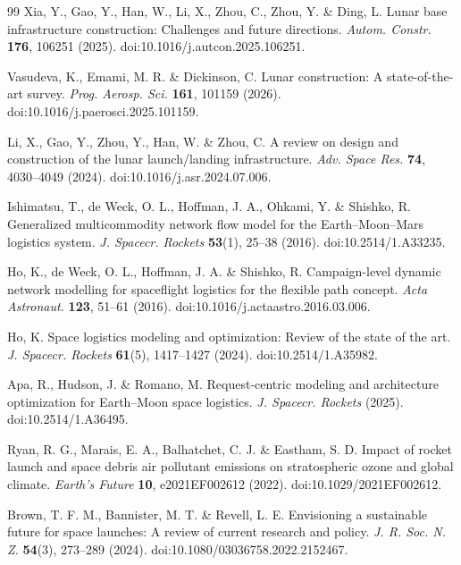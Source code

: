 \documentclass[12pt]{article}
\begin{document}
\begin{thebibliography}{99}
	Xia, Y., Gao, Y., Han, W., Li, X., Zhou, C., Zhou, Y. \& Ding, L.
	Lunar base infrastructure construction: Challenges and future directions.
	\textit{Autom. Constr.} \textbf{176}, 106251 (2025).
	doi:10.1016/j.autcon.2025.106251.
	
	Vasudeva, K., Emami, M. R. \& Dickinson, C.
	Lunar construction: A state-of-the-art survey.
	\textit{Prog. Aerosp. Sci.} \textbf{161}, 101159 (2026).
	doi:10.1016/j.paerosci.2025.101159.
	
	Li, X., Gao, Y., Zhou, Y., Han, W. \& Zhou, C.
	A review on design and construction of the lunar launch/landing infrastructure.
	\textit{Adv. Space Res.} \textbf{74}, 4030--4049 (2024).
	doi:10.1016/j.asr.2024.07.006.
	
	Ishimatsu, T., de Weck, O. L., Hoffman, J. A., Ohkami, Y. \& Shishko, R.
	Generalized multicommodity network flow model for the Earth--Moon--Mars logistics system.
	\textit{J. Spacecr. Rockets} \textbf{53}(1), 25--38 (2016).
	doi:10.2514/1.A33235.
	
	Ho, K., de Weck, O. L., Hoffman, J. A. \& Shishko, R.
	Campaign-level dynamic network modelling for spaceflight logistics for the flexible path concept.
	\textit{Acta Astronaut.} \textbf{123}, 51--61 (2016).
	doi:10.1016/j.actaastro.2016.03.006.
	
	Ho, K.
	Space logistics modeling and optimization: Review of the state of the art.
	\textit{J. Spacecr. Rockets} \textbf{61}(5), 1417--1427 (2024).
	doi:10.2514/1.A35982.
	
	Apa, R., Hudson, J. \& Romano, M.
	Request-centric modeling and architecture optimization for Earth--Moon space logistics.
	\textit{J. Spacecr. Rockets} (2025).
	doi:10.2514/1.A36495.
	
	Ryan, R. G., Marais, E. A., Balhatchet, C. J. \& Eastham, S. D.
	Impact of rocket launch and space debris air pollutant emissions on stratospheric ozone and global climate.
	\textit{Earth's Future} \textbf{10}, e2021EF002612 (2022).
	doi:10.1029/2021EF002612.
	
	Brown, T. F. M., Bannister, M. T. \& Revell, L. E.
	Envisioning a sustainable future for space launches: A review of current research and policy.
	\textit{J. R. Soc. N. Z.} \textbf{54}(3), 273--289 (2024).
	doi:10.1080/03036758.2022.2152467.
	

\end{thebibliography}
\end{document}
